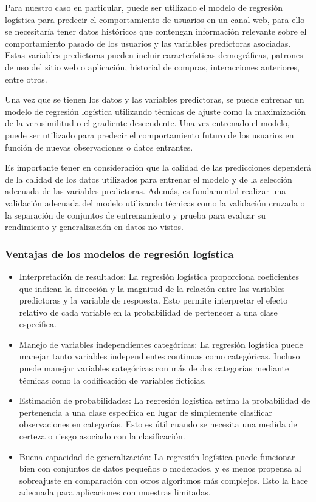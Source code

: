 Para nuestro caso en particular, puede ser utilizado el modelo de regresión logística para predecir el comportamiento de usuarios en un canal web, para ello se necesitaría tener datos históricos que contengan información relevante sobre el comportamiento pasado de los usuarios y las variables predictoras asociadas. Estas variables predictoras pueden incluir características demográficas, patrones de uso del sitio web o aplicación, historial de compras, interacciones anteriores, entre otros.

Una vez que se tienen los datos y las variables predictoras, se puede entrenar un modelo de regresión logística utilizando técnicas de ajuste como la maximización de la verosimilitud o el gradiente descendente. Una vez entrenado el modelo, puede ser utilizado para predecir el comportamiento futuro de los usuarios en función de nuevas observaciones o datos entrantes.

Es importante tener en consideración que la calidad de las predicciones dependerá de la calidad de los datos utilizados para entrenar el modelo y de la selección adecuada de las variables predictoras. Además, es fundamental realizar una validación adecuada del modelo utilizando técnicas como la validación cruzada o la separación de conjuntos de entrenamiento y prueba para evaluar su rendimiento y generalización en datos no vistos.

\subsubsection{Ventajas de los modelos de regresión logística}

\begin{itemize}
    \item Interpretación de resultados: La regresión logística proporciona coeficientes que indican la dirección y la magnitud de la relación entre las variables predictoras y la variable de respuesta. Esto permite interpretar el efecto relativo de cada variable en la probabilidad de pertenecer a una clase específica.
    \item Manejo de variables independientes categóricas: La regresión logística puede manejar tanto variables independientes continuas como categóricas. Incluso puede manejar variables categóricas con más de dos categorías mediante técnicas como la codificación de variables ficticias.
    \item Estimación de probabilidades: La regresión logística estima la probabilidad de pertenencia a una clase específica en lugar de simplemente clasificar observaciones en categorías. Esto es útil cuando se necesita una medida de certeza o riesgo asociado con la clasificación.
    \item Buena capacidad de generalización: La regresión logística puede funcionar bien con conjuntos de datos pequeños o moderados, y es menos propensa al sobreajuste en comparación con otros algoritmos más complejos. Esto la hace adecuada para aplicaciones con muestras limitadas.    
\end{itemize}

